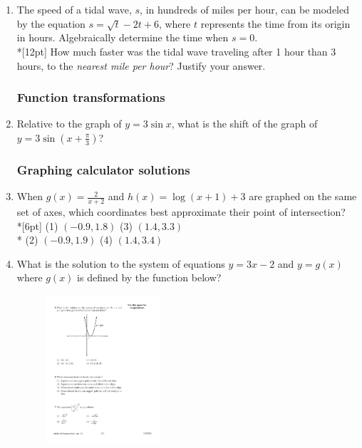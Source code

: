 \documentclass[12pt, oneside]{article}
\begin{document}
\begin{enumerate}
\item The speed of a tidal wave, $s$, in hundreds of miles per hour, can be modeled by the equation $s= \sqrt{t}-2t+6$, where $t$ represents the time from its origin in hours. Algebraically determine the time when $s=0$.\\*[12pt]
How much faster was the tidal wave traveling after 1 hour than 3 hours, to the \textit{nearest mile per hour}? Justify your answer.


\subsubsection*{Function transformations}
\item Relative to the graph of $y=3 \sin x$, what is the shift of the graph of $y=3 \sin {\left(x+ \frac{\pi}{3}\right)}$?

\subsubsection*{Graphing calculator solutions}
\item When $\displaystyle g(x)=\frac{2}{x+2}$ and $h(x)= \log (x+1)+3$ are graphed on the same set of axes, which coordinates best approximate their point of intersection?\\*[6pt]
(1) $(-0.9,1.8)$ \qquad (3) $(1.4,3.3)$ \\*
(2) $(-0.9,1.9)$ \qquad (4) $(1.4,3.4)$

\item What is the solution to the system of equations $y=3x-2$ and $y=g(x)$ where $g(x)$ is defined by the function below?

\begin{figure}[!ht]
    \centering
    \includegraphics[width=0.4\textwidth]{parabola-graphic.pdf}
\end{figure}



\end{enumerate}
\end{document}
